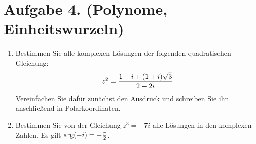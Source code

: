 \documentclass[german,12pt]{homework}
\DeclarePairedDelimiter{\enbrace}{(}{)}
\begin{document}
    \section*{Aufgabe 4. (Polynome, Einheitswurzeln)}

    \begin{problem}
        \begin{enumerate}
            \item Bestimmen Sie alle komplexen Lösungen der folgenden
            quadratischen Gleichung:
            \[z^2 = \frac{1 - i + \enbrace*{1 + i}\sqrt{3}}{2 - 2i}\]
            Vereinfachen Sie dafür zunächst den Ausdruck und schreiben Sie ihn
            anschließend in Polarkoordinaten.
            \item Bestimmen Sie von der Gleichung \(z^3 = -7i\) alle Lösungen
            in den komplexen Zahlen. Es gilt \(\arg\enbrace*{-i} = -
            \frac{\pi}{2}\).
        \end{enumerate}
    \end{problem}
\end{document}
